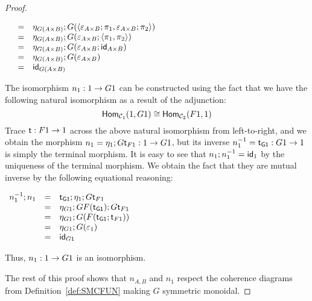 \begin{proof}
\begin{center}
\begin{math}
\begin{array}{lll}
        & = & \eta_{G(A \times B)};G(\langle \varepsilon_{A \times B};\pi_1, \varepsilon_{A \times B};\pi_2 \rangle)\\
        & = & \eta_{G(A \times B)};G(\varepsilon_{A \times B};\langle \pi_1, \pi_2 \rangle)\\
        & = & \eta_{G(A \times B)};G(\varepsilon_{A \times B};\mathsf{id}_{A \times B})\\
        & = & \eta_{G(A \times B)};G(\varepsilon_{A \times B})\\
        & = & \mathsf{id}_{G(A \times B)}
      \end{array}
    \end{math}
  \end{center}

  The isomorphism $n_1 : 1 \rightarrow G1$ can be constructed using the fact
  that we have the following natural isomorphism as a result of the
  adjunction:
  \[
  \mathsf{Hom}_{\mathcal{C}_1}(1,G1) \cong \mathsf{Hom}_{\mathcal{C}_2}(F1,1)
  \]
  Trace $\mathsf{t} : F1 \rightarrow 1$ across the above natural isomorphism
  from left-to-right, and we obtain the morphism $n_1 =
  \eta_1;G\mathsf{t}_{F1} : 1 \rightarrow G1$, but its inverse $n^{-1}_1 =
  \mathsf{t_{G1}} : G1 \rightarrow 1$ is simply the terminal morphism.  It is
  easy to see that $n_1;n^{-1}_1 = \mathsf{id}_1$ by the uniqueness of the
  terminal morphism.  We obtain the fact that they are mutual inverse
  by the following equational reasoning:
  \begin{center}
    \begin{math}
      \begin{array}{lll}
        n^{-1}_1;n_1
        & = & \mathsf{t_{G1}};\eta_1;G\mathsf{t}_{F1}\\
        & = & \eta_{G1};GF(\mathsf{t_{G1}});G\mathsf{t}_{F1}\\
        & = & \eta_{G1};G(F(\mathsf{t_{G1}};\mathsf{t}_{F1}))\\
        & = & \eta_{G1};G(\varepsilon_1)\\
        & = & \mathsf{id}_{G1}\\
      \end{array}
    \end{math}
  \end{center}
  Thus, $n_1 : 1 \rightarrow G1$ is an isomorphism.

  The rest of this proof shows that $n_{A,B}$ and $n_1$ respect the coherence
  diagrams from Definition~\ref{def:SMCFUN} making $G$ symmetric monoidal.


\end{proof}
